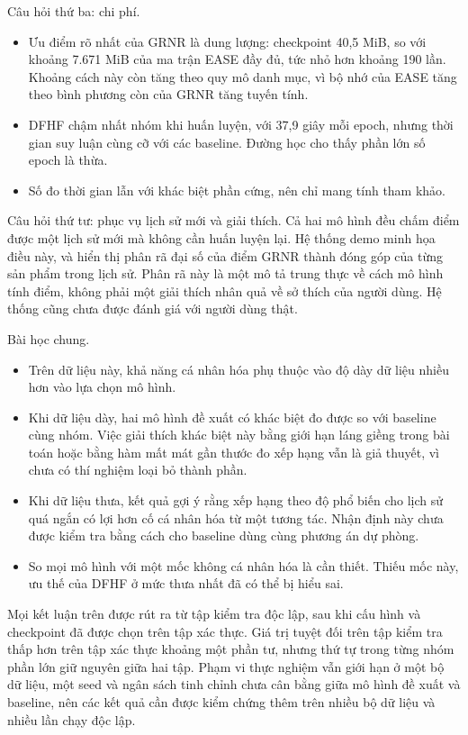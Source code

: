 Câu hỏi thứ ba: chi phí.
\begin{itemize}
\item Ưu điểm rõ nhất của GRNR là dung lượng: checkpoint 40,5 MiB, so với khoảng 7.671 MiB của ma trận EASE đầy đủ, tức nhỏ hơn khoảng 190 lần. Khoảng cách này còn tăng theo quy mô danh mục, vì bộ nhớ của EASE tăng theo bình phương còn của GRNR tăng tuyến tính.
\item DFHF chậm nhất nhóm khi huấn luyện, với 37,9 giây mỗi epoch, nhưng thời gian suy luận cùng cỡ với các baseline. Đường học cho thấy phần lớn số epoch là thừa.
\item Số đo thời gian lẫn với khác biệt phần cứng, nên chỉ mang tính tham khảo.
\end{itemize}

Câu hỏi thứ tư: phục vụ lịch sử mới và giải thích. Cả hai mô hình đều chấm điểm được một lịch sử mới mà không cần huấn luyện lại. Hệ thống demo minh họa điều này, và hiển thị phân rã đại số của điểm GRNR thành đóng góp của từng sản phẩm trong lịch sử. Phân rã này là một mô tả trung thực về cách mô hình tính điểm, không phải một giải thích nhân quả về sở thích của người dùng. Hệ thống cũng chưa được đánh giá với người dùng thật.

Bài học chung.
\begin{itemize}
\item Trên dữ liệu này, khả năng cá nhân hóa phụ thuộc vào độ dày dữ liệu nhiều hơn vào lựa chọn mô hình.
\item Khi dữ liệu dày, hai mô hình đề xuất có khác biệt đo được so với baseline cùng nhóm. Việc giải thích khác biệt này bằng giới hạn láng giềng trong bài toán hoặc bằng hàm mất mát gần thước đo xếp hạng vẫn là giả thuyết, vì chưa có thí nghiệm loại bỏ thành phần.
\item Khi dữ liệu thưa, kết quả gợi ý rằng xếp hạng theo độ phổ biến cho lịch sử quá ngắn có lợi hơn cố cá nhân hóa từ một tương tác. Nhận định này chưa được kiểm tra bằng cách cho baseline dùng cùng phương án dự phòng.
\item So mọi mô hình với một mốc không cá nhân hóa là cần thiết. Thiếu mốc này, ưu thế của DFHF ở mức thưa nhất đã có thể bị hiểu sai.
\end{itemize}

Mọi kết luận trên được rút ra từ tập kiểm tra độc lập, sau khi cấu hình và checkpoint đã được chọn trên tập xác thực. Giá trị tuyệt đối trên tập kiểm tra thấp hơn trên tập xác thực khoảng một phần tư, nhưng thứ tự trong từng nhóm phần lớn giữ nguyên giữa hai tập. Phạm vi thực nghiệm vẫn giới hạn ở một bộ dữ liệu, một seed và ngân sách tinh chỉnh chưa cân bằng giữa mô hình đề xuất và baseline, nên các kết quả cần được kiểm chứng thêm trên nhiều bộ dữ liệu và nhiều lần chạy độc lập.


